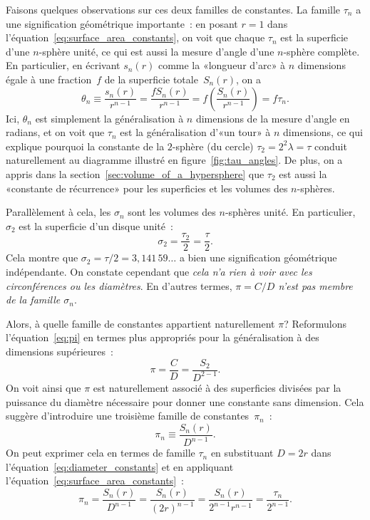 Faisons quelques observations sur ces deux familles de constantes. La
famille $\tau_n$ a une signification géométrique importante~: en posant $r=1$
dans l'équation~\eqref{eq:surface_area_constants}, on voit que chaque $\tau_n$
est la superficie d'une $n$-sphère unité, ce qui est aussi la mesure d'angle d'une
$n$-sphère complète. En particulier, en écrivant $s_n(r)$ comme la «\ns longueur
d'arc\ns » à $n$ dimensions égale à une fraction~$f$ de la superficie
totale~$S_n(r)$, on a
\[
\theta_n \equiv \frac{s_n(r)}{r^{n-1}} = \frac{f S_n(r)}{r^{n-1}} = f\left(\frac{S_n(r)}{r^{n-1}}\right) = f\tau_n.
\]
Ici, $\theta_n$ est simplement la généralisation à $n$ dimensions de la mesure
d'angle en radians, et on voit que $\tau_n$ est la généralisation d'«\ns un tour\ns » à
$n$ dimensions, ce qui explique pourquoi la constante de la $2$-sphère (du
cercle) $\tau_2 = 2^2 \lambda = \tau$ conduit naturellement au diagramme
illustré en figure~\ref{fig:tau_angles}. De plus, on a appris dans la
section~\ref{sec:volume_of_a_hypersphere} que $\tau_2$ est aussi la «\ns constante
de récurrence\ns » pour les superficies et les volumes des $n$-sphères.

Parallèlement à cela, les $\sigma_n$ sont les volumes des $n$-sphères unité. En
particulier, $\sigma_2$ est la superficie d'un disque unité~:
\[
\sigma_2 = \frac{\tau_2}{2} = \frac{\tau}{2}.
\]
Cela montre que $\sigma_2 = \tau/2 = 3{,}141\,59\ldots$ a bien une
signification géométrique indépendante. On constate cependant que \emph{cela
n'a rien à voir avec les circonférences ou les diamètres}. En d'autres termes,
\emph{$\pi = C/D$ n'est pas membre de la famille $\sigma_n$}.

Alors, à quelle famille de constantes appartient naturellement $\pi$\ns?
Reformulons l'équation~\eqref{eq:pi} en termes plus appropriés pour la
généralisation à des dimensions supérieures~:
\[
\pi = \frac{C}{D} = \frac{S_2}{D^{2-1}}.
\]
On voit ainsi que $\pi$ est naturellement associé à des superficies divisées par
la puissance du diamètre nécessaire pour donner une constante sans dimension.
Cela suggère d'introduire une troisième famille de constantes~$\pi_n$~:
\begin{equation}
\label{eq:diameter_constants}
\pi_n \equiv \frac{S_n(r)}{D^{n-1}}.
\end{equation}
On peut exprimer cela en termes de famille $\tau_n$ en substituant $D = 2r$ dans
l'équation~\eqref{eq:diameter_constants} et en appliquant
l'équation~\eqref{eq:surface_area_constants}~:
\[
\pi_n = \frac{S_n(r)}{D^{n-1}} = \frac{S_n(r)}{(2r)^{n-1}} =
\frac{S_n(r)}{2^{n-1}r^{n-1}} = \frac{\tau_n}{2^{n-1}}.
\]

